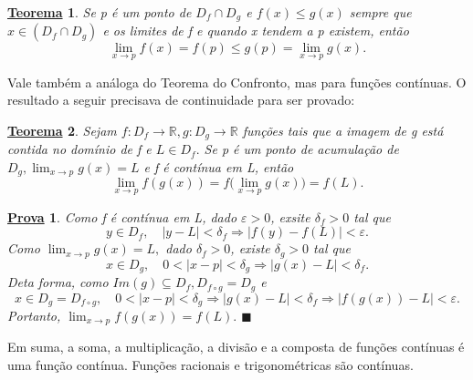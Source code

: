 \documentclass{article}
\newtheorem*{theorem*}{\underline{Teorema}}
\newtheorem*{proof*}{\underline{Prova}}
\renewcommand\qedsymbol{$\blacksquare$}
\begin{document}
\begin{theorem*}
  Se p \'e um ponto de $D_{f}\cap D_{g}$ e $f(x)\leq{g(x)}$ sempre que $x\in{(D_{f}\cap D_{g})}$ e os limites de f e
  quando x tendem a p existem, ent\~ao 
    $$
      \lim_{x\to p}f(x) = f(p)\leq{g(p)} = \lim_{x\to p}g(x).
    $$
\end{theorem*}
Vale tamb\'em a an\'aloga do Teorema do Confronto, mas para fun\c c\~oes cont\'inuas. O resultado a seguir precisava
de continuidade para ser provado:
\begin{theorem*}
  Sejam $f:D_{f}\rightarrow \mathbb{R}, g:D_{g}\rightarrow \mathbb{R}$ fun\c c\~oes tais que a imagem de g est\'a contida
  no dom\'inio de f e $L\in D_{f}.$ Se p \'e um ponto de acumula\c c\~ao de $D_{g}, \lim_{x\to p}g(x) = L$ e f \'e cont\'inua
  em L, ent\~ao 
    $$
      \lim_{x\to p}f(g(x)) = f\biggl(\lim_{x\to p}g(x)\biggr) = f(L).
    $$
\end{theorem*}
\begin{proof*}
  Como f \'e cont\'inua em L, dado $\varepsilon > 0$, exsite $\delta_{f}>0$ tal que 
    $$
      y\in D_{f},\quad |y-L|<\delta_{f} \Rightarrow |f(y)-f(L)|<\varepsilon.
    $$
    Como $\lim_{x\to p}g(x) = L,$ dado $\delta_{f}>0$, existe $\delta_{g}>0$ tal que 
      $$
        x\in D_{g},\quad 0 <|x-p|<\delta_{g} \Rightarrow |g(x)-L|<\delta_{f}.
      $$
    Deta forma, como $Im(g)\subseteq{D_{f}}, D_{f\circ{g}}=D_{g}$ e 
      $$
        x\in D_{g}=D_{f\circ{g}}, \quad 0<|x-p|<\delta_{g}\Rightarrow|g(x)-L|<\delta_{f}\Rightarrow|f(g(x))-L|<\varepsilon.
      $$
      Portanto, $\lim_{x\to p}f(g(x))=f(L).$ \qedsymbol
\end{proof*}
  Em suma, a soma, a multiplica\c c\~ao, a divis\~ao e a composta de fun\c c\~oes cont\'inuas \'e uma fun\c c\~ao cont\'inua. Fun\c c\~oes
  racionais e trigonom\'etricas s\~ao cont\'inuas.
  
\end{document}
